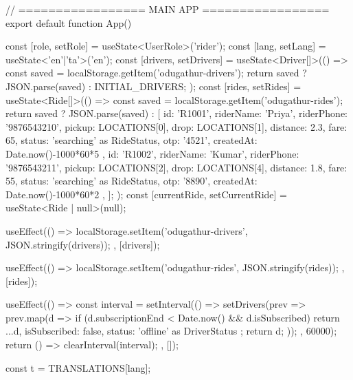 // ================= MAIN APP =================
export default function App() {
  const [role, setRole] = useState<UserRole>('rider');
  const [lang, setLang] = useState<'en'|'ta'>('en');
  const [drivers, setDrivers] = useState<Driver[]>(() => {
    const saved = localStorage.getItem('odugathur-drivers');
    return saved ? JSON.parse(saved) : INITIAL_DRIVERS;
  });
  const [rides, setRides] = useState<Ride[]>(() => {
    const saved = localStorage.getItem('odugathur-rides');
    return saved ? JSON.parse(saved) : [
      { id: 'R1001', riderName: 'Priya', riderPhone: '9876543210', pickup: LOCATIONS[0], drop: LOCATIONS[1], distance: 2.3, fare: 65, status: 'searching' as RideStatus, otp: '4521', createdAt: Date.now()-1000*60*5 },
      { id: 'R1002', riderName: 'Kumar', riderPhone: '9876543211', pickup: LOCATIONS[2], drop: LOCATIONS[4], distance: 1.8, fare: 55, status: 'searching' as RideStatus, otp: '8890', createdAt: Date.now()-1000*60*2 },
    ];
  });
  const [currentRide, setCurrentRide] = useState<Ride | null>(null);

  useEffect(() => {
    localStorage.setItem('odugathur-drivers', JSON.stringify(drivers));
  }, [drivers]);

  useEffect(() => {
    localStorage.setItem('odugathur-rides', JSON.stringify(rides));
  }, [rides]);

  useEffect(() => {
    const interval = setInterval(() => {
      setDrivers(prev => prev.map(d => {
        if (d.subscriptionEnd < Date.now() && d.isSubscribed) {
          return { ...d, isSubscribed: false, status: 'offline' as DriverStatus };
        }
        return d;
      }));
    }, 60000);
    return () => clearInterval(interval);
  }, []);

  const t = TRANSLATIONS[lang];

}
